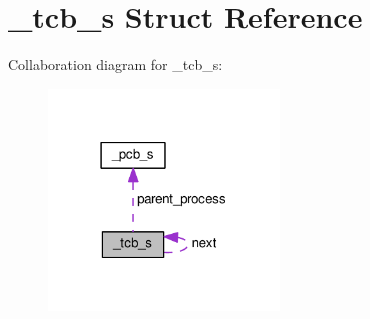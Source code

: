 \hypertarget{struct__tcb__s}{}\section{\+\_\+tcb\+\_\+s Struct Reference}
\label{struct__tcb__s}


Collaboration diagram for \+\_\+tcb\+\_\+s\+:
\nopagebreak
\begin{figure}[H]
\begin{center}
\leavevmode
\includegraphics[width=174pt]{struct__tcb__s__coll__graph}
\end{center}
\end{figure}
